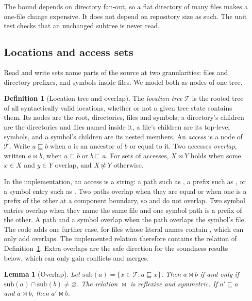 \documentclass[11pt,letterpaper]{article}
\newtheorem{lemma}[theorem]{Lemma}
\theoremstyle{definition}
\newtheorem{definition}[theorem]{Definition}
\theoremstyle{remark}
\newcommand{\Loc}{\mathcal{T}}
\newcommand{\meets}{\bowtie}
\newcommand{\nmeets}{\not\bowtie}
\newcommand{\cov}{\sqsubseteq}
\begin{document}
The bound depends on directory fan-out, so a flat directory of many files makes a one-file change expensive. It does not depend on repository size as such. The unit test  checks that an unchanged subtree is never read.

\subsection{Locations and access sets}

Read and write sets name parts of the source at two granularities: files and directory prefixes, and symbols inside files. We model both as nodes of one tree.

\begin{definition}[Location tree and overlap]
\label{def:tlsc:access}
The \emph{location tree} $\Loc$ is the rooted tree of all syntactically valid locations, whether or not a given tree state contains them. Its nodes are the root, directories, files and symbols; a directory's children are the directories and files named inside it, a file's children are its top-level symbols, and a symbol's children are its nested members. An \emph{access} is a node of $\Loc$. Write $a\cov b$ when $a$ is an ancestor of $b$ or equal to it. Two accesses \emph{overlap}, written $a\meets b$, when $a\cov b$ or $b\cov a$. For sets of accesses, $X\meets Y$ holds when some $x\in X$ and $y\in Y$ overlap, and $X\nmeets Y$ otherwise.
\end{definition}

In the implementation, an access is a string: a path such as , a prefix such as , or a symbol entry such as . Two paths overlap when they are equal or when one is a prefix of the other at a component boundary, so  and  do not overlap. Two symbol entries overlap when they name the same file and one symbol path is a \code{::} prefix of the other. A path and a symbol overlap when the path overlaps the symbol's file. The code adds one further case, for files whose literal names contain \code{#}, which can only add overlaps. The implemented relation therefore contains the relation of Definition~\ref{def:tlsc:access}. Extra overlaps are the safe direction for the soundness results below, which can only gain conflicts and merges.

\begin{lemma}[Overlap]
\label{lem:tlsc:overlap}
Let $\mathrm{sub}(a)=\{x\in\Loc : a\cov x\}$. Then $a\meets b$ if and only if $\mathrm{sub}(a)\cap\mathrm{sub}(b)\neq\varnothing$. The relation $\meets$ is reflexive and symmetric. If $a'\cov a$ and $a\meets b$, then $a'\meets b$.
\end{lemma}
\end{document}
